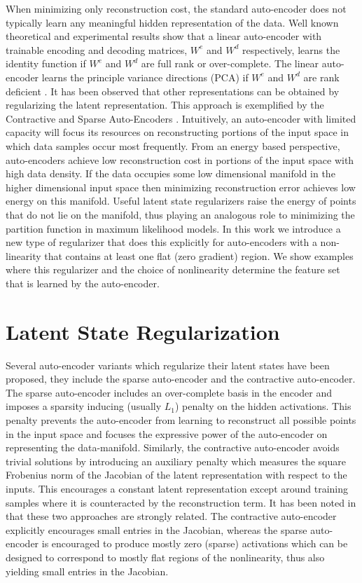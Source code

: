 \documentclass{article} %
\begin{document}
\noindent
When minimizing only reconstruction cost, the standard auto-encoder does not typically learn any meaningful hidden representation of the data. Well known theoretical and experimental results show that a linear auto-encoder with trainable encoding and decoding matrices, $W^e$ and $W^d$ respectively, learns the identity function if $W^e$ and $W^d$ are full rank or over-complete. The linear auto-encoder learns the principle variance directions (PCA) if $W^e$ and $W^d$ are rank deficient \cite{DHS}. It has been observed that other representations can be obtained by regularizing the latent representation. This approach is exemplified by the Contractive and Sparse Auto-Encoders \cite{CAE} \cite{SAE1} \cite{SAE2}. Intuitively, an auto-encoder with limited capacity will focus its resources on reconstructing portions of the input space in which data samples occur most frequently. From an energy based perspective, auto-encoders achieve low reconstruction cost in portions of the input space with high data density. If the data occupies some low dimensional manifold in the higher dimensional input space then minimizing reconstruction error achieves low energy on this manifold. Useful latent state regularizers raise the energy of points that do not lie on the manifold, thus playing an analogous role to minimizing the partition function in maximum likelihood models. In this work we introduce a new type of regularizer that does this explicitly for auto-encoders with a non-linearity that contains at least one flat (zero gradient) region. We show examples where this regularizer and the choice of nonlinearity determine the feature set that is learned by the auto-encoder.      

\section{Latent State Regularization}    
Several auto-encoder variants which regularize their latent states have been proposed, they include the sparse auto-encoder and the contractive auto-encoder\cite{SAE1}\cite{SAE2}\cite{CAE}. The sparse auto-encoder includes an over-complete basis in the encoder and imposes a sparsity inducing (usually $L_1$) penalty on the hidden activations. This penalty prevents the auto-encoder from learning to reconstruct all possible points in the input space and focuses the expressive power of the auto-encoder on representing the data-manifold. Similarly, the contractive auto-encoder avoids trivial solutions by introducing an auxiliary penalty which measures the square  Frobenius norm of the Jacobian of the latent representation with respect to the inputs. This encourages a constant latent representation except around training samples where it is counteracted by the reconstruction term. It has been noted in \cite{CAE} that these two approaches are strongly related. The contractive auto-encoder explicitly encourages small entries in the Jacobian, whereas the sparse auto-encoder is encouraged to produce mostly zero (sparse) activations which can be designed to correspond to mostly flat regions of the nonlinearity, thus also yielding small entries in the Jacobian.
\end{document}
